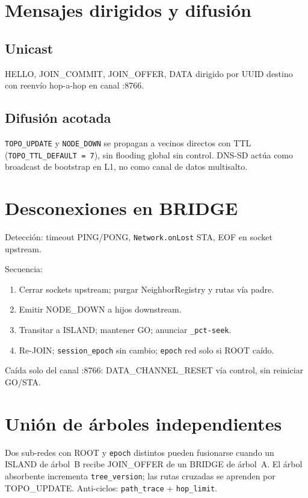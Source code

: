 \section{Mensajes dirigidos y difusión}
\label{sec:mensajes-broadcast}

\subsection{Unicast}

HELLO, JOIN\_COMMIT, JOIN\_OFFER, DATA dirigido por UUID destino con reenvío hop-a-hop en canal :8766.

\subsection{Difusión acotada}

\texttt{TOPO\_UPDATE} y \texttt{NODE\_DOWN} se propagan a vecinos directos con TTL (\texttt{TOPO\_TTL\_DEFAULT = 7}), sin flooding global sin control. DNS-SD actúa como broadcast de bootstrap en L1, no como canal de datos multisalto.

\section{Desconexiones en BRIDGE}
\label{sec:diseno-desconexion-bridge}

Detección: timeout PING/PONG, \texttt{Network.onLost} STA, EOF en socket upstream.

Secuencia:
\begin{enumerate}
  \item Cerrar sockets upstream; purgar NeighborRegistry y rutas vía padre.
  \item Emitir NODE\_DOWN a hijos downstream.
  \item Transitar a ISLAND; mantener GO; anunciar \texttt{\_pct-seek}.
  \item Re-JOIN; \texttt{session\_epoch} sin cambio; \texttt{epoch} red solo si ROOT caído.
\end{enumerate}

Caída solo del canal :8766: DATA\_CHANNEL\_RESET vía control, sin reiniciar GO/STA.

\section{Unión de árboles independientes}
\label{sec:union-arboles}

Dos sub-redes con ROOT y \texttt{epoch} distintos pueden fusionarse cuando un ISLAND de árbol~B recibe JOIN\_OFFER de un BRIDGE de árbol~A. El árbol absorbente incrementa \texttt{tree\_version}; las rutas cruzadas se aprenden por TOPO\_UPDATE. Anti-ciclos: \texttt{path\_trace} + \texttt{hop\_limit}.

